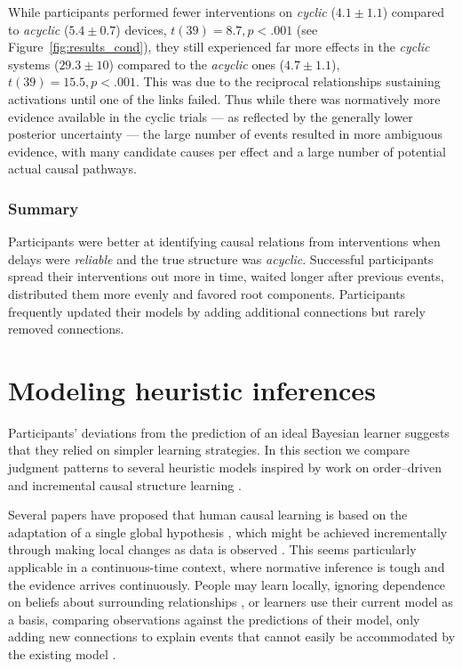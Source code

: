 \documentclass[10pt,letterpaper]{article}
\begin{document}
While participants performed fewer interventions on  \emph{cyclic} ($4.1\pm1.1$) compared to \emph{acyclic} ($5.4\pm0.7$) devices, $t(39) = 8.7, p <.001$ (see Figure~\ref{fig:results_cond}), they still experienced far more effects in the \emph{cyclic} systems ($29.3\pm10$) compared to the \emph{acyclic} ones ($4.7\pm1.1$), $t(39) = 15.5, p<.001$.  This was due to the reciprocal relationships sustaining activations until one of the links failed.  Thus while there was normatively more evidence available in the cyclic trials --- as reflected by the generally lower posterior uncertainty --- the large number of events resulted in more ambiguous evidence, with many candidate causes per effect and a large number of potential actual causal pathways.


\subsubsection{Summary}

Participants were better at identifying causal relations from interventions when delays were \emph{reliable} and the true structure was \emph{acyclic}.  
Successful participants spread their interventions out more in time, waited longer after previous events, distributed them more evenly and favored root components.    
Participants frequently updated their models by adding additional connections but rarely removed connections.

\section{Modeling heuristic inferences}

Participants' deviations from the prediction of an ideal Bayesian learner suggests that they relied on simpler learning strategies. In this section we compare judgment patterns to several heuristic models inspired by work on order--driven \citep[e.g.,][]{bramley2014order,mccormack2015temporal} and incremental causal structure learning \citep[e.g.,][]{bonawitz2014win, bramley2017neurath}.

Several papers have proposed that human causal learning is based on the adaptation of a single global hypothesis \citep{bonawitz2014win}, which might be achieved incrementally through making local changes as data is observed \citep{bramley2017neurath}. This seems particularly applicable in a continuous-time context, where normative inference is tough and the evidence arrives continuously.  People may learn locally, ignoring dependence on beliefs about surrounding relationships \citep[e.g.][]{fernbach2009causal}, or learners use their current model as a basis, comparing observations against the predictions of their model, only adding new connections to explain events that cannot easily be accommodated by the existing model \citep{bramley2017neurath}.
\end{document}
